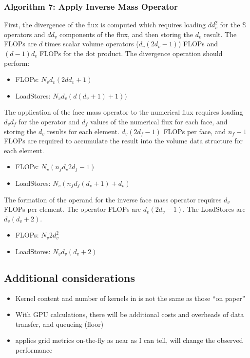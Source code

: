 \documentclass[11pt]{article}
\begin{document}
\subsubsection{Algorithm 7: Apply Inverse Mass Operator}
First, the divergence of the flux is computed which requires loading $d d_v^2$ for the $\mathbb{S}$ operators and $d d_v$ components of the flux, and then storing the $d_v$ result.  The FLOPs are $d$ times scalar volume operators ($d_v(2d_v - 1)$) FLOPs and $(d-1)d_v$ FLOPs for the dot product.  The divergence operation should perform:

\begin{itemize}
\item FLOPs: $N_v d_v (2 d d_v + 1)$
\item LoadStores: $N_v d_v (d (d_v + 1) + 1))$
\end{itemize}

The application of the face mass operator to the numerical flux requires loading $d_v d_f$ for the operator and $d_f$ values of the numerical flux for each face, and storing the $d_v$ results for each element. $d_v (2d_f-1)$ FLOPs per face, and $n_f-1$ FLOPs are required to accumulate the result into the volume data structure for each element.

\begin{itemize}
\item FLOPs: $N_v (n_f d_v 2d_f - 1)$
\item LoadStores: $N_v (n_f d_f(d_v + 1) + d_v)$
\end{itemize}

The formation of the operand for the inverse face mass operator requires $d_v$ FLOPs per element. The operator FLOPs are $d_v(2d_v - 1)$.  The LoadStores are $d_v(d_v + 2)$.

\begin{itemize}
\item FLOPs: $N_v 2 d_v^2$
\item LoadStores: $N_v d_v(d_v + 2)$
\end{itemize}

\subsection{Additional considerations}
\begin{itemize}
\item Kernel content and number of kernels in \ceesdcode{} is not the same as those ``on paper''
\item With GPU calculations, there will be additional costs and overheads of data transfer, and queueing (floor)
\item \ceesdcode{} applies grid metrics on-the-fly as near as I can tell, will change the observed performance
\end{itemize}
\end{document}

